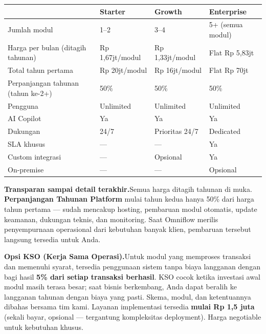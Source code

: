 \documentclass[a4paper]{article}
\begin{document}
{\fontsize{8.5}{12}\selectfont\color{TextDark}%
\begin{tabular}{p{4.6cm}p{3.6cm}p{3.6cm}p{3.6cm}}
 & {\bfseries\color{BlueDark} Starter} & {\bfseries\color{BlueDark} Growth} & {\bfseries\color{BlueDark} Enterprise} \\
\hline
Jumlah modul & 1--2 & 3--4 & 5+ (semua modul) \\
Harga per bulan (ditagih tahunan) & Rp 1,67jt/modul & Rp 1,33jt/modul & Flat Rp 5,83jt \\
Total tahun pertama & Rp 20jt/modul & Rp 16jt/modul & Flat Rp 70jt \\
Perpanjangan tahunan (tahun ke-2+) & 50\% & 50\% & 50\% \\
Pengguna & Unlimited & Unlimited & Unlimited \\
AI Copilot & Ya & Ya & Ya \\
Dukungan & 24/7 & Prioritas 24/7 & Dedicated \\
SLA khusus & --- & --- & Ya \\
Custom integrasi & --- & Opsional & Ya \\
On-premise & --- & --- & Opsional \\
\hline
\end{tabular}}

\vspace{8pt}

{\setlength{\fboxsep}{8pt}\setlength{\fboxrule}{0pt}%
\noindent\colorbox{BlueBg}{%
    \begin{minipage}{\dimexpr\textwidth-2\fboxsep\relax}
        {\fontsize{8.5}{11}\selectfont\color{TextDark}%
        \textbf{\color{BluePrimary}Transparan sampai detail terakhir.}\enspace Semua harga ditagih tahunan di muka. \textbf{Perpanjangan Tahunan Platform} mulai tahun kedua hanya 50\% dari harga tahun pertama --- sudah mencakup hosting, pembaruan modul otomatis, update keamanan, dukungan teknis, dan monitoring. Saat Omniflow merilis penyempurnaan operasional dari kebutuhan banyak klien, pembaruan tersebut langsung tersedia untuk Anda.\par\vspace{4pt}
        \textbf{\color{EmeraldDark}Opsi KSO (Kerja Sama Operasi).}\enspace Untuk modul yang memproses transaksi dan memenuhi syarat, tersedia penggunaan sistem tanpa biaya langganan dengan bagi hasil \textbf{5\% dari setiap transaksi berhasil}. KSO cocok ketika investasi awal modul masih terasa besar; saat bisnis berkembang, Anda dapat beralih ke langganan tahunan dengan biaya yang pasti. Skema, modul, dan ketentuannya dibahas bersama tim kami. Layanan implementasi tersedia \textbf{mulai Rp 1,5 juta} (sekali bayar, opsional --- tergantung kompleksitas deployment). Harga negotiable untuk kebutuhan khusus.}
    \end{minipage}}}
\end{document}
